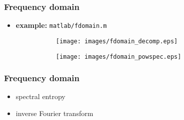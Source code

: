 \begin{frame}
	\frametitle{Frequency domain}
	\begin{itemize}
		\item \textbf{example:} \texttt{matlab/fdomain.m}
			\begin{figure}
				\centering
				\begin{subfigure}[t]{0.48\linewidth}
					\texttt{[image: images/fdomain\_decomp.eps]}
				\end{subfigure}
				\hspace{0.01\linewidth}
				\begin{subfigure}[t]{0.48\linewidth}
					\texttt{[image: images/fdomain\_powspec.eps]}
				\end{subfigure}
			\end{figure}
	\end{itemize}
\end{frame}

\begin{frame}
	\frametitle{Frequency domain}
	\begin{itemize}
		\item spectral entropy
		\item inverse Fourier transform
	\end{itemize}
\end{frame}

